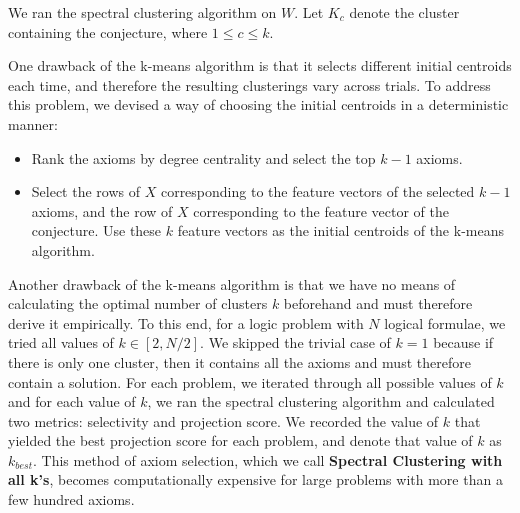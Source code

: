 \documentclass[EPiC]{easychair}
\begin{document}
We ran the spectral clustering algorithm on $W$.
Let $K_{c}$ denote the cluster containing the conjecture, where 
$1 \leq c \leq k$. 

One drawback of the k-means algorithm is that it selects different initial 
centroids each time, and therefore the resulting clusterings vary across 
trials. To address this problem, we devised a way of choosing the initial 
centroids in a deterministic manner:
\begin{itemize}
\item Rank the axioms by degree centrality and select the top $k-1$ axioms.
\item Select the rows of $X$ corresponding to the feature vectors of the
      selected $k-1$ axioms, and the row of $X$ corresponding to the feature 
      vector of the conjecture. 
      Use these $k$ feature vectors as the initial centroids of the k-means 
      algorithm. 
\end{itemize}

Another drawback of the k-means algorithm is that we have no means of 
calculating the optimal number of clusters $k$ beforehand and must therefore 
derive it empirically. To this end, for a logic problem with $N$ logical 
formulae, we tried all values of $k \in [2, N/2]$. We skipped the trivial 
case of $k=1$ because if there is only one cluster, then it contains all the 
axioms and must therefore contain a solution. For each problem, we iterated
through all possible values of $k$ and for each value of $k$, we ran the
spectral clustering algorithm and calculated two metrics: selectivity and 
projection score. We recorded the value of $k$ that yielded the best 
projection score for each problem, and denote that value of $k$ as 
$k_{best}$. This method of axiom selection, which we call 
\textbf{Spectral Clustering with all k's}, becomes computationally 
expensive for large problems with more than a few hundred axioms.
\end{document}

